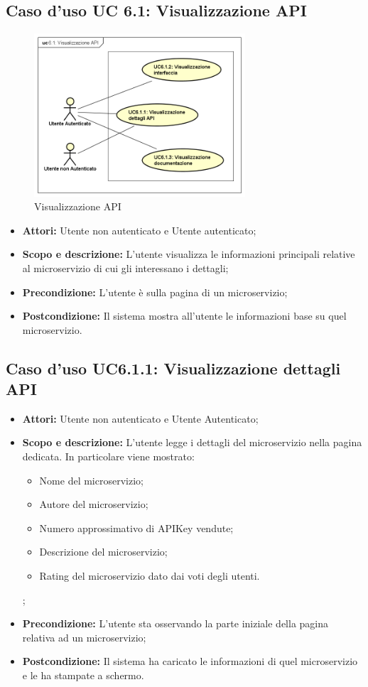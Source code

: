 \documentclass[12pt,a4paper,titlepage]{article}
\begin{document}
	\subsection{Caso d'uso UC 6.1: Visualizzazione API}
	\label{UC6.1}
	\begin{figure}[H]
		\centering
		\includegraphics[width=0.7\textwidth]{UseCase/VisualizzazioneAPI}
		\caption{Visualizzazione API}
	\end{figure}
	\begin{itemize}
		\item \textbf{Attori: }Utente non autenticato e Utente autenticato;
		\item \textbf{Scopo e descrizione: }L'utente visualizza le informazioni principali relative al microservizio di cui gli interessano i dettagli;
		\item \textbf{Precondizione: }L'utente è sulla pagina di un microservizio;
		\item \textbf{Postcondizione: }Il sistema mostra all'utente le informazioni base su quel microservizio.
	\end{itemize}
	\subsection{Caso d'uso UC6.1.1: Visualizzazione dettagli API}
	\label{UC6.1.1}
	\begin{itemize}
		\item \textbf{Attori: }Utente non autenticato e Utente Autenticato;
		\item \textbf{Scopo e descrizione: }L'utente legge i dettagli del microservizio nella pagina dedicata. In particolare viene mostrato:
		\begin{itemize}
			\item Nome del microservizio;
			\item Autore del microservizio;
			\item Numero approssimativo di APIKey vendute;
			\item Descrizione del microservizio;
			\item Rating del microservizio dato dai voti degli utenti.
		\end{itemize};
		\item \textbf{Precondizione: }L'utente sta osservando la parte iniziale della pagina relativa ad un microservizio;
		\item \textbf{Postcondizione: }Il sistema ha caricato le informazioni di quel microservizio e le ha stampate a schermo.
	\end{itemize}
\end{document}
